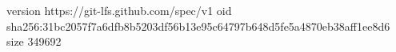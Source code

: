 version https://git-lfs.github.com/spec/v1
oid sha256:31bc2057f7a6dfb8b5203df56b13e95c64797b648d5fe5a4870eb38aff1ee8d6
size 349692

